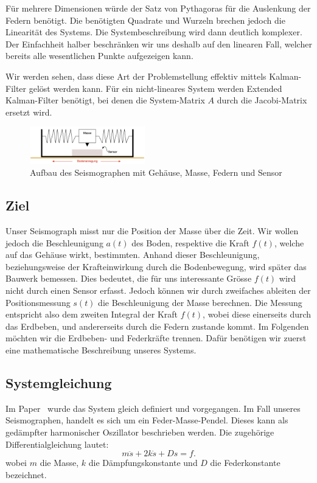 Für mehrere Dimensionen würde der Satz von Pythagoras für die Auslenkung der Federn benötigt.
Die benötigten Quadrate und Wurzeln brechen jedoch die Linearität des Systems.
Die Systembeschreibung wird dann deutlich komplexer.
Der Einfachheit halber beschränken wir uns deshalb auf den linearen Fall,
welcher bereits alle wesentlichen Punkte aufgezeigen kann.

Wir werden sehen, dass diese Art der Problemstellung effektiv mittels Kalman-Filter gelöst werden kann.
Für ein nicht-lineares System werden Extended Kalman-Filter benötigt,
bei denen die System-Matrix $A$ durch die Jacobi-Matrix ersetzt wird.

\begin{figure}
 \begin{center}
 \includegraphics[width=5cm]{papers/erdbeben/Apperatur}
 \caption{Aufbau des Seismographen mit Gehäuse, Masse, Federn und Sensor}
 \label{erdbeben:Seismograph}
 \end{center}
\end{figure}

\subsection{Ziel}
Unser Seismograph misst nur die Position der Masse über die Zeit. 
Wir wollen jedoch die Beschleunigung $a(t)$ des Boden,
respektive die Kraft $f(t)$,
welche auf das Gehäuse wirkt, bestimmten.  
Anhand dieser Beschleunigung,
beziehungsweise der Krafteinwirkung durch die Bodenbewegung,
wird später das Bauwerk bemessen.
Dies bedeutet, die für uns interessante Grösse $f(t)$ wird nicht durch einen Sensor erfasst. 
Jedoch können wir durch zweifaches ableiten der Positionsmessung $s(t)$ die Beschleunigung der Masse berechnen. 
Die Messung entspricht also dem zweiten Integral der Kraft $f(t)$,
wobei diese einerseits durch das Erdbeben, und andererseits durch die Federn zustande kommt.
Im Folgenden möchten wir die Erdbeben- und Federkräfte trennen.
Dafür benötigen wir zuerst eine mathematische Beschreibung unseres Systems.

\subsection{Systemgleichung}
Im Paper~\cite{erdbeben:mendezmueller} wurde das System gleich definiert und vorgegangen. 
Im Fall unseres Seismographen, handelt es sich um ein Feder-Masse-Pendel.
Dieses kann als gedämpfter harmonischer Oszillator beschrieben werden. 
Die zugehörige Differentialgleichung lautet:
\begin{equation}
	\label{erdbeben:Systemgleichung}
m\ddot s + 2k \dot s + Ds = f.
\end{equation}
wobei $m$ die Masse, $k$ die Dämpfungskonstante und $D$ die Federkonstante bezeichnet.

